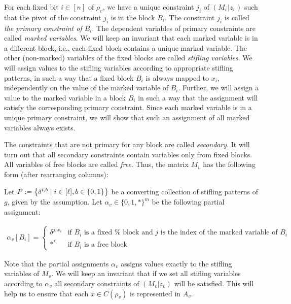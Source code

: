 For each fixed bit $i\in[n]$ of $\rho_{v}$, we have a unique constraint $j_{i}$ of $(M_{v}|z_{v})$ such that the pivot of the constraint $j_{i}$ is in the block $B_{i}$.
The constraint $j_{i}$ is called \emph{the primary constraint of $B_{i}$}.
The dependent variables of primary constraints are called \emph{marked variables}.
We will keep an invariant that each marked variable is in a different block, i.e., each fixed block contains a unique marked variable.
The other (non-marked) variables of the fixed blocks are called \emph{stifling variables}.
We will assign values to the stifling variables according to appropriate stifling patterns, in such a way that a fixed block $B_{i}$ is always mapped to $x_{i}$, independently on the value of the marked variable of $B_{i}$.
Further, we will assign a value to the marked variable in a block $B_{i}$ in such a way that the assignment will satisfy the corresponding primary constraint.
Since each marked variable is in a unique primary constraint, we will show that such an assignment of all marked variables always exists.\par




The constraints that are not primary for any block are called \emph{secondary}.
It will turn out that all secondary constraints contain variables only from fixed blocks.
All variables of free blocks are called \emph{free}.
Thus, the matrix $M_{v}$ has the following form (after rearranging columns):\par







Let $P:=\bigl{\{}\delta^{i,b}\mid i\in[\ell],b\in\{0,1\}\bigr{\}}$ be a converting collection of stifling patterns of $g$, given by the assumption.
Let $\alpha_{v}\in\{0,1,*\}^{m}$ be the following partial assignment:\par


\[\begin{gathered}
\alpha_{v}[B_{i}]=\begin{cases}\delta^{j,x_{i}}&\text{if $B_{i}$ is a fixed %
block and $j$ is the index of the marked variable of $B_{i}$}\\
*^{\ell}&\text{if $B_{i}$ is a free block}\end{cases}
\end{gathered}\]


Note that the partial assignments $\alpha_{v}$ assigns values exactly to the stifling variables of $M_{v}$.
We will keep an invariant that if we set all stifling variables according to $\alpha_{v}$ all secondary constraints of $(M_{v}|z_{v})$ will be satisfied.
This will help us to ensure that each $\bar{x}\in C(\rho_{v})$ is represented in $A_{v}$.\par




